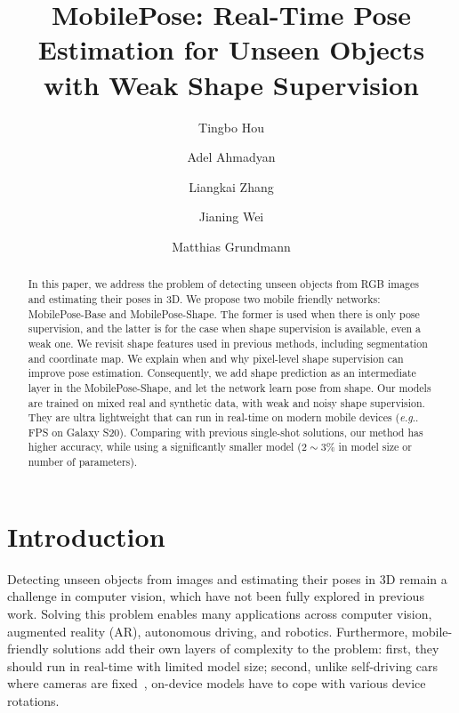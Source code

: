 \documentclass[runningheads]{llncs}
\makeatletter
\DeclareRobustCommand\onedot{\futurelet\@let@token\@onedot}
\def\@onedot{\ifx\@let@token.\else.\null\fi\xspace}
\def\eg{\emph{e.g}\onedot} \def\Eg{\emph{E.g}\onedot}
\makeatother
\begin{document}
\pagestyle{headings}
\mainmatter
\def\ECCVSubNumber{****}  

\title{MobilePose: Real-Time Pose Estimation for Unseen Objects with Weak Shape Supervision} 

\begin{comment}
\titlerunning{ECCV-20 submission ID \ECCVSubNumber} 
\authorrunning{ECCV-20 submission ID \ECCVSubNumber} 
\author{Anonymous ECCV submission}
\institute{Paper ID \ECCVSubNumber}
\end{comment}


\author{Tingbo Hou \and
Adel Ahmadyan \and
Liangkai Zhang \and
Jianing Wei \and
Matthias Grundmann}
\maketitle

\begin{abstract}
In this paper, we address the problem of detecting unseen objects from RGB images and estimating their poses in 3D. We propose two mobile friendly networks: MobilePose-Base and MobilePose-Shape. The former is used when there is only pose supervision, and the latter is for the case when shape supervision is available, even a weak one. We revisit shape features used in previous methods, including segmentation and coordinate map. We explain when and why pixel-level shape supervision can improve pose estimation. Consequently, we add shape prediction as an intermediate layer in the MobilePose-Shape, and let the network learn pose from shape. Our models are trained on mixed real and synthetic data, with weak and noisy shape supervision. They are ultra lightweight that can run in real-time on modern mobile devices (\eg 36 FPS on Galaxy S20). Comparing with previous single-shot solutions, our method has higher accuracy, while using a significantly smaller model ($2\sim3\%$ in model size or number of parameters).

\end{abstract}


\section{Introduction}

Detecting unseen objects from images and estimating their poses in 3D remain a challenge in computer vision, which have not been fully explored in previous work. Solving this problem enables many applications across computer vision, augmented reality (AR), autonomous driving, and robotics. Furthermore, mobile-friendly solutions add their own layers of complexity to the problem: first, they should run in real-time with limited model size; second, unlike self-driving cars where cameras are fixed~\cite{Mousavian_2017_BBox,Dijk_2019_Depth}, on-device models have to cope with various device rotations.
\end{document}
